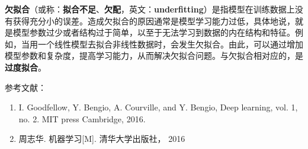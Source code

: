 

\textbf{欠拟合}（或称：\textbf{拟合不足}、\textbf{欠配}，英文：\textbf{underfitting}）是指模型在训练数据上没有获得充分小的误差。造成欠拟合的原因通常是模型学习能力过低，具体地说，就是模型参数过少或者结构过于简单，以至于无法学习到数据的内在结构和特征。例如，当用一个线性模型去拟合非线性数据时，会发生欠拟合。由此，可以通过增加模型参数和复杂度，提高学习能力，从而解决欠拟合问题。与欠拟合相对应的，是\textbf{过度拟合}。



参考文献：
\begin{enumerate}
\item I. Goodfellow, Y. Bengio, A. Courville, and Y. Bengio, Deep learning, vol. 1, no. 2. MIT press Cambridge, 2016.
\item 周志华. 机器学习[M]. 清华大学出版社， 2016
\end{enumerate}